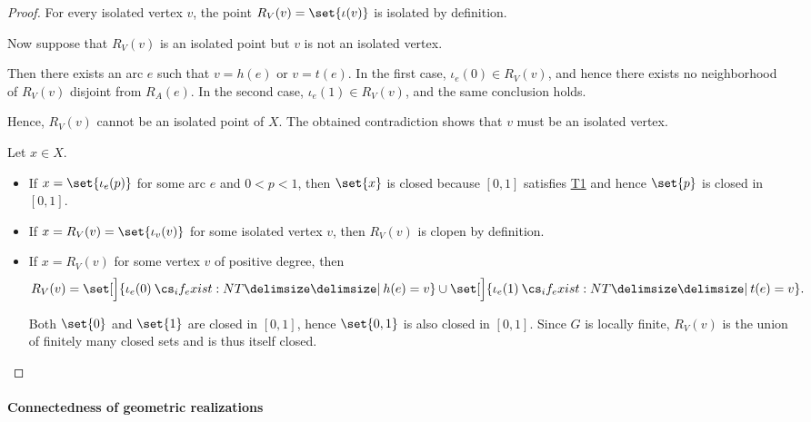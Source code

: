 \begin{proof}

  \SufficiencySubProof* For every isolated vertex \( v \), the point \( R_V(v) = \set{ \iota(v) } \) is isolated by definition.

  \NecessitySubProof* Now suppose that \( R_V(v) \) is an isolated point but \( v \) is not an isolated vertex.

  Then there exists an arc \( e \) such that \( v = h(e) \) or \( v = t(e) \). In the first case, \( \iota_e(0) \in R_V(v) \), and hence there exists no neighborhood of \( R_V(v) \) disjoint from \( R_A(e) \). In the second case, \( \iota_e(1) \in R_V(v) \), and the same conclusion holds.

  Hence, \( R_V(v) \) cannot be an isolated point of \( X \). The obtained contradiction shows that \( v \) must be an isolated vertex.

   Let \( x \in X \).

  \begin{itemize}
    \item If \( x = \set{ \iota_e(p) } \) for some arc \( e \) and \( 0 < p < 1 \), then \( \set{ x } \) is closed because \( [0, 1] \) satisfies \hyperref[def:separation_axioms/T1]{T1} and hence \( \set{ p } \) is closed in \( [0, 1] \).

    \item If \( x = R_V(v) = \set{ \iota_v(v) } \) for some isolated vertex \( v \), then \( R_V(v) \) is clopen by definition.

    \item If \( x = R_V(v) \) for some vertex \( v \) of positive degree, then
    \begin{equation*}
      R_V(v) = \set[\Big]{ \iota_e(0) \given* h(e) = v } \cup \set[\Big]{ \iota_e(1) \given* t(e) = v }.
    \end{equation*}

    Both \( \set{ 0 } \) and \( \set{ 1 } \) are closed in \( [0, 1] \), hence \( \set{ 0, 1 } \) is also closed in \( [0, 1] \). Since \( G \) is locally finite, \( R_V(v) \) is the union of finitely many closed sets and is thus itself closed.
  \end{itemize}
\end{proof}

\paragraph{Connectedness of geometric realizations}

